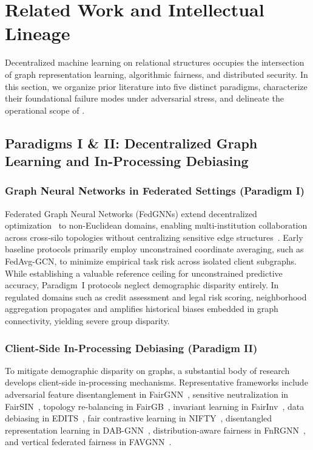 \section{Related Work and Intellectual Lineage}
\label{sec:related_work}

Decentralized machine learning on relational structures occupies the intersection of graph representation learning, algorithmic fairness, and distributed security. In this section, we organize prior literature into five distinct paradigms, characterize their foundational failure modes under adversarial stress, and delineate the operational scope of \MethodName{}.

\subsection{Paradigms I \& II: Decentralized Graph Learning and In-Processing Debiasing}
\label{subsec:rw_paradigms_1_2}

\subsubsection{Graph Neural Networks in Federated Settings (Paradigm I)}
Federated Graph Neural Networks (FedGNNs) extend decentralized optimization~\citep{mcmahan2017communication, kairouz2021advances} to non-Euclidean domains, enabling multi-institution collaboration across cross-silo topologies without centralizing sensitive edge structures~\citep{kipf2016semi, velickovic2017graph}. Early baseline protocols primarily employ unconstrained coordinate averaging, such as FedAvg-GCN, to minimize empirical task risk across isolated client subgraphs. While establishing a valuable reference ceiling for unconstrained predictive accuracy, Paradigm~I protocols neglect demographic disparity entirely. In regulated domains such as credit assessment and legal risk scoring, neighborhood aggregation propagates and amplifies historical biases embedded in graph connectivity, yielding severe group disparity.

\subsubsection{Client-Side In-Processing Debiasing (Paradigm II)}
To mitigate demographic disparity on graphs, a substantial body of research develops client-side in-processing mechanisms. Representative frameworks include adversarial feature disentanglement in FairGNN~\citep{dai2021say}, sensitive neutralization in FairSIN~\citep{yang2024fairsin}, topology re-balancing in FairGB~\citep{li2024fairgb}, invariant learning in FairInv~\citep{zhu2024fairinv}, data debiasing in EDITS~\citep{dong2022edits}, fair contrastive learning in NIFTY~\citep{agarwal2021towards}, disentangled representation learning in DAB-GNN~\citep{lee2025dabgnn}, distribution-aware fairness in FnRGNN~\citep{fnrgnn2025}, and vertical federated fairness in FAVGNN~\citep{wang2026favgnn}. 

